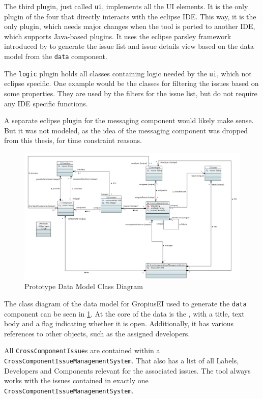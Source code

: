 The third plugin, just called \lstinline|ui|, implements all the \gls{UI} elements.
It is the only plugin of the four that directly interacts with the eclipse \gls{IDE}.
This way, it is the only plugin, which needs major changes when the tool is ported to another \gls{IDE}, which supports Java-based plugins.
It uses the eclipse parsley framework introduced by \cite{bettini2014developing} to generate the issue list and issue details view 
based on the data model from the \lstinline|data| component.

The \lstinline|logic| plugin holds all classes containing logic needed by the \lstinline|ui|, which not eclipse specific.
One example would be the classes for filtering the issues based on some properties.
They are used by the filters for the issue list, but do not require any \gls{IDE} specific functions.

A separate eclipse plugin for the messaging component would likely make sense.
But it was not modeled, as the idea of the messaging component was dropped from this thesis, for time constraint reasons.

\begin{figure}[!h]
	\centering
	\includegraphics[width=\textwidth]{graphics/dataClassDiagram.png}
	\caption{Prototype Data Model Class Diagram}
	\label{fig:c4:data_class_diagram}
\end{figure}
The class diagram of the data model for \gls{GropiusEI} used to generate the \lstinline|data| component can be seen in \cref{fig:c4:data_class_diagram}.
At the core of the data is the , with a title, text body and a flag indicating whether it is open.
Additionally, it has various references to other objects, such as the assigned developers.

All \lstinline|CrossComponentIssue|s are contained within a \lstinline|CrossComponentIssueManagementSystem|.
That also has a list of all Labels, Developers and Components relevant for the associated issues.
The tool always works with the issues contained in exactly one \lstinline|CrossComponentIssueManagementSystem|.

